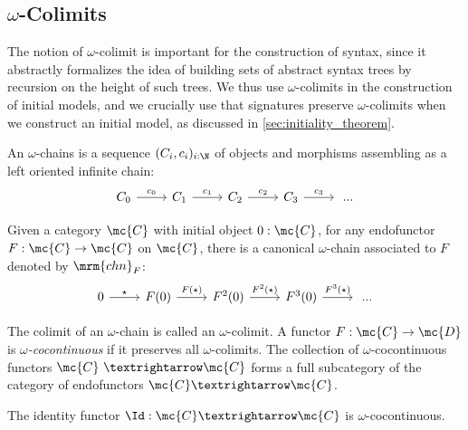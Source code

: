 \subsection{$ω$-Colimits}
\label{subsec:omega-colimits}

The notion of $ω$-colimit is important for the construction of syntax, since it
abstractly formalizes the idea of building sets of abstract syntax trees by
recursion on the height of such trees.
We thus use $ω$-colimits in the construction of initial models, and we crucially
use that signatures preserve $ω$-colimits when we construct an initial model, as
discussed in \cref{sec:initiality_theorem}.

\begin{definition}[$ω$-chains]
  An $ω$-chains is a sequence $(C_i, c_i)_{i : \N}$ of objects and
  morphisms assembling as a left oriented infinite chain:
  \[
    \begin{tikzcd}
      C_0 \ar[r, "c_0"]
        & C_1 \ar[r, "c_1"]
        & C_2 \ar[r, "c_2"]
        & C_3 \ar[r, "c_3"]
        & \; ...
    \end{tikzcd}
  \]
\end{definition}

\begin{example}
  Given a category $\mc{C}$ with initial object $0 : \mc{C}$, for any
  endofunctor $F : \mc{C} \to \mc{C}$  on $\mc{C}$, there is a canonical
  $ω$-chain associated to $F$ denoted by $\mrm{chn}_F$:
  \[
    \begin{tikzcd}
      0 \ar[r, "\star"]
        & F(0) \ar[r,   "F(\star)"]
        & F^2(0) \ar[r, "F^2(\star)"]
        & F^3(0) \ar[r, "F^3(\star)"]
        & \; ...
    \end{tikzcd}
  \]
\end{example}

\begin{definition}
  \label{def:omega-cocontinuous}
  The colimit of an $ω$-chain is called an $ω$-colimit.
  A functor $F : \mc{C} \to \mc{D}$ is \emph{$ω$-cocontinuous} if it
  preserves all $ω$-colimits.
  The collection of $ω$-cocontinuous functors $\mc{C} → \mc{C}$ forms a full subcategory
  of the category of endofunctors $\mc{C} → \mc{C}$.
\end{definition}

\begin{example}
  The identity functor $\Id : \mc{C} → \mc{C}$ is $ω$-cocontinuous.
\end{example}


